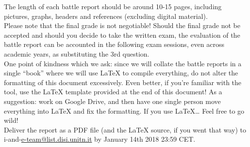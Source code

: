 The length of each battle report should be around 10-15 pages, including pictures, graphs, headers and references (excluding digital material). \\
Please note that the final grade is not negotiable! Should the final grade not be accepted and should you decide to take the written exam, the evaluation of the battle report can be accounted in the following exam sessions, even across academic years, as substituting the 3rd question. \\
One point of kindness which we ask: since we will collate the battle reports in a single “book” where we will use LaTeX to compile everything, do not alter the formatting of this document excessively. Even better, if you’re familiar with the tool, use the LaTeX template provided at the end of this document!  As a suggestion: work on Google Drive, and then have one single person move everything into LaTeX and fix the formatting. If you use LaTeX… Feel free to go wild! \\
Deliver the report as a PDF file (and the LaTeX source, if you went that way) to i-and-\url{e-team@list.disi.unitn.it} by January 14th 2018 23:59 CET.\\